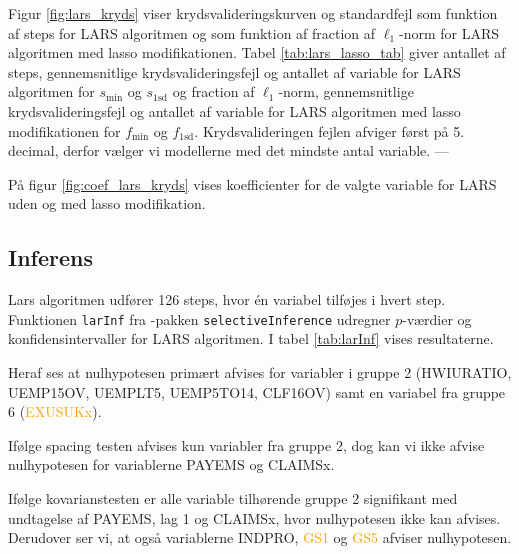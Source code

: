 Figur \ref{fig:lars_kryds} viser krydsvalideringskurven og standardfejl som funktion af steps for LARS algoritmen og som funktion af fraction af \(\ell_1\)-norm for LARS algoritmen med lasso modifikationen. 
%
Tabel \ref{tab:lars_lasso_tab} giver antallet af steps, gennemsnitlige krydsvalideringsfejl og antallet af variable for LARS algoritmen for \(s_\text{min}\) og \(s_{1 \text{sd}}\) og fraction af \(\ell_1\)-norm, gennemsnitlige krydsvalideringsfejl og antallet af variable for LARS algoritmen med lasso modifikationen for \(f_\text{min}\) og \(f_{1 \text{sd}}\).
Krydsvalideringen fejlen afviger først på 5. decimal, derfor vælger vi modellerne med det mindste antal variable. ---
%

%
På figur \ref{fig:coef_lars_kryds} vises koefficienter for de valgte variable for LARS uden og med lasso modifikation.
%

\newpage
\subsection{Inferens}
Lars algoritmen udfører 126 steps, hvor én variabel tilføjes i hvert step.
Funktionen \texttt{larInf} fra \Rlang-pakken \texttt{selectiveInference} udregner \(p\)-værdier og konfidensintervaller for LARS algoritmen.
I tabel \ref{tab:larInf} vises resultaterne.
%

%
Heraf ses at nulhypotesen primært afvises for variabler i gruppe 2 (\textcolor{blue3}{HWIURATIO}, \textcolor{blue3}{UEMP15OV}, \textcolor{blue3}{UEMPLT5}, \textcolor{blue3}{UEMP5TO14}, \textcolor{blue3}{CLF16OV}) samt en variabel fra gruppe 6 (\textcolor{orange}{EXUSUKx}).

Ifølge spacing testen afvises kun variabler fra gruppe 2, dog kan vi ikke afvise nulhypotesen for variablerne \textcolor{blue3}{PAYEMS} og \textcolor{blue3}{CLAIMSx}.

Ifølge kovarianstesten er alle variable tilhørende gruppe 2 signifikant med undtagelse af \textcolor{blue3}{PAYEMS}, \textcolor{blue3}{lag 1} og \textcolor{blue3}{CLAIMSx}, hvor nulhypotesen ikke kan afvises.
Derudover ser vi, at også variablerne \textcolor{chartreuse4}{INDPRO}, \textcolor{orange}{GS1} og \textcolor{orange}{GS5} afviser nulhypotesen.


